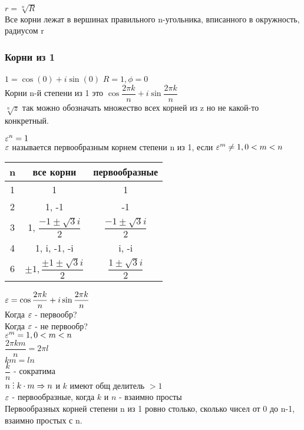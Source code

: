 $ r = \sqrt[n]{R} $ \\
Все корни лежат в вершинах правильного n-угольника, вписанного в окружность, радиусом r 
\subsubsection{Корни из 1}
$ 1 = \cos(0) + i \sin (0) $ 
$ R = 1, \phi = 0 $ \\
Корни n-й степени из 1 это $ \cos \dfrac{2 \pi k}{n} + i \sin \dfrac{2 \pi k}{n} $ \\
$ \sqrt[n]{z} $ так можно обозначать множество всех корней из z но не какой-то конкретный. \\
\begin{definition}
	$ \varepsilon^n = 1 $ \\
	$ \varepsilon $ называется первообразным корнем степени n из 1, если $ \varepsilon^m \neq 1, 0 < m < n $ \\
	
	\begin{tabular}{|c|c|c|}
		\hline
		n & все корни & первообразные \\
		\hline
		1 & 1 & 1 \\
		\hline
		2 & 1, -1 & -1 \\
		\hline
		3 & 1, $\dfrac{-1 \pm \sqrt{3} i }{2}$&  $\dfrac{-1 \pm \sqrt{3} i }{2}$\\
		\hline
		4 & 1, i, -1, -i & i, -i  \\
		\hline
		6 & $ \pm 1, \dfrac{\pm1 \pm \sqrt{3} i }{2}$&  $\dfrac{1 \pm \sqrt{3} i }{2}$\\
		\hline
	\end{tabular} 
\end{definition}

$ \varepsilon = \cos \dfrac{2 \pi k}{ n} + i \sin \dfrac{2 \pi k}{n} $ \\
Когда $ \varepsilon $ - первообр? \\
 Когда $ \varepsilon $ - не первообр? \\
$ \varepsilon^m = 1, 0 < m < n $ \\
$ \dfrac{2 \pi km}{n} = 2 \pi l $ \\
$ km = ln $ \\
$ \dfrac{k}{n}$ - сократима \\
$ n \divby k \cdot m \Rightarrow n$ и $k $ имеют общ делитель $ > 1 $\\
$ \varepsilon $ - первообразные, когда $k $ и $ n $ - взаимно просты \\
Первообразных корней степени n из 1 ровно столько, сколько чисел от 0 до n-1, взаимно простых с n. \\

